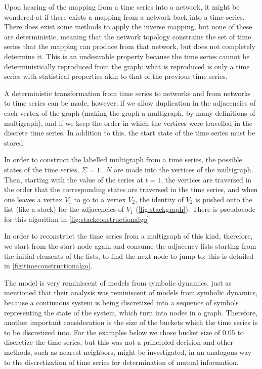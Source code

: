 \documentclass[12pt]{article}
\begin{document}
Upon hearing of the mapping from a time series into a network, it might be wondered at if there exists a mapping from a network back into a time series. There does exist some methods to apply the inverse mapping, but none of these are deterministic, meaning that the network topology constrains the set of time series that the mapping can produce from that network, but does not completely determine it\cite{campanharo}. This is an undesirable property because the time series cannot be deterministically reproduced from the graph: what is reproduced is only a time series with statistical properties akin to that of the previous time series.

A deterministic transformation from time series to networks and from networks to time series can be made, however, if we allow duplication in the adjacencies of each vertex of the graph (making the graph a multigraph, by many definitions of multigraph\cite{multigraph}), and if we keep the order in which the vertices were travelled in the discrete time series. In addition to this, the start state of the time series must be stored.

In order to construct the labelled multigraph from a time series, the possible states of the time series, $\Sigma = {1 ... N}$ are made into the vertices of the multigraph. Then, starting with the value of the series at $t =1$, the vertices are traversed in the order that the corresponding states are traversed in the time series, and when one leaves a vertex $V_1$ to go to a vertex $V_2$, the identity of $V_2$ is pushed onto the list (like a stack) for the adjacencies of $V_1$ (\ref{fig:stackgraph}). There is pseudocode for this algorithm in \ref{fig:stackconstructionalgo}

In order to reconstruct the time series from a multigraph of this kind, therefore, we start from the start node again and consume the adjacency lists starting from the initial elements of the lists, to find the next node to jump to: this is detailed in \ref{fig:timeconstructionalgo}.

The model is very reminiscent of models from symbolic dynamics, just as \cite{campanharo} mentioned that their analysis was reminiscent of models from symbolic dynamics, because a continuous system is being discretized into a sequence of symbols representing the state of the system, which turn into nodes in a graph. Therefore, another important consideration is the size of the buckets which the time series is to be discretized into. For the examples below we chose bucket size of $0.05$ to discretize the time series, but this was not a principled decision and other methods, such as nearest neighbors, might be investigated, in an analogous way to the discretization of time series for determination of mutual information\cite{nnmi}.
\end{document}
